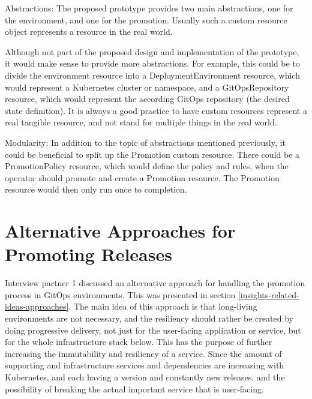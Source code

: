 Abstractions:
The proposed prototype provides two main abstractions,
one for the environment,
and one for the promotion.
Usually such a custom resource object represents a resource in the real world.

Although not part of the proposed design and implementation of the prototype,
it would make sense to provide more abstractions.
For example, this could be to divide the environment resource into
a DeploymentEnvironment resource, which would represent a Kubernetes cluster or namespace,
and a GitOpsRepository resource, which would represent the according GitOps repository (the desired state definition).
It is always a good practice to have custom resources represent a real tangible resource,
and not stand for multiple things in the real world.

Modularity:
In addition to the topic of abstractions mentioned previously,
it could be beneficial to split up the Promotion custom resource.
There could be a PromotionPolicy resource,
which would define the policy and rules,
when the operator should promote and create a Promotion resource.
The Promotion resource would then only run once to completion.














\section*{Alternative Approaches for Promoting Releases}

Interview partner 1 discussed an alternative approach for handling the promotion process in GitOps environments.
This was presented in section \ref{insights-related-ideas-approaches}.
The main idea of this approach is that long-living environments are not necessary,
and the resiliency should rather be created by doing progressive delivery,
not just for the user-facing application or service,
but for the whole infrastructure stack below.
This has the purpose of further increasing the immutability and resiliency of a service.
Since the amount of supporting and infrastructure services and dependencies are increasing with Kubernetes,
and each having a version and constantly new releases, and the possibility of breaking the actual important
service that is user-facing.


